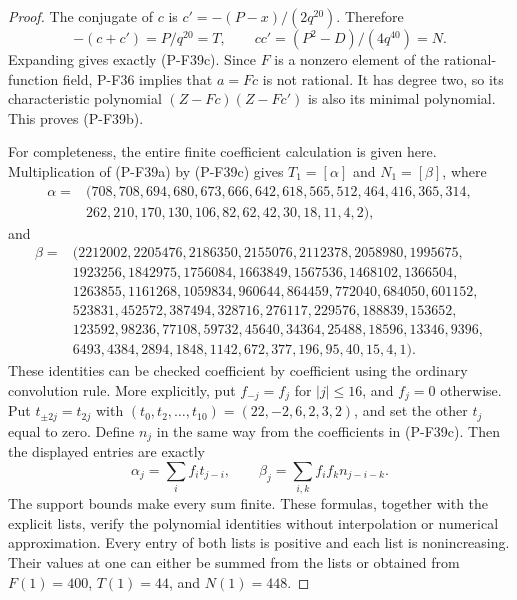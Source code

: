 \begin{proof}
The conjugate of $c$ is $c'=-(P-x)/(2q^{20})$. Therefore
\[
       -(c+c')=P/q^{20}=T,
 \qquad cc'=(P^2-D)/(4q^{40})=N.
 \tag{P-F39d}
\]
Expanding gives exactly (P-F39c). Since $F$ is a nonzero element
of the rational-function field, P-F36 implies that $a=Fc$ is
not rational. It has degree two, so its characteristic polynomial
$(Z-Fc)(Z-Fc')$ is also its minimal polynomial. This proves
(P-F39b).

For completeness, the entire finite coefficient calculation is
given here. Multiplication of (P-F39a) by (P-F39c) gives
$T_1=[\alpha]$ and $N_1=[\beta]$, where
\[
\begin{split}
\alpha={}&(708,708,694,680,673,666,642,618,565,512,464,416,365,314,\\
&262,210,170,130,106,82,62,42,30,18,11,4,2),
\end{split}
 \tag{P-F39e}
\]
and
\[
\begin{split}
\beta={}&(2212002,2205476,2186350,2155076,2112378,2058980,1995675,\\
&1923256,1842975,1756084,1663849,1567536,1468102,1366504,\\
&1263855,1161268,1059834,960644,864459,772040,684050,601152,\\
&523831,452572,387494,328716,276117,229576,188839,153652,\\
&123592,98236,77108,59732,45640,34364,25488,18596,13346,9396,\\
&6493,4384,2894,1848,1142,672,377,196,95,40,15,4,1).
\end{split}
 \tag{P-F39f}
\]
These identities can be checked coefficient by coefficient using
the ordinary convolution rule. More explicitly, put $f_{-j}=f_j$
for $|j|\le16$, and $f_j=0$ otherwise. Put
$t_{\pm 2j}=t_{2j}$ with $(t_0,t_2,\ldots,t_{10})=(22,-2,6,2,3,2)$,
and set the other $t_j$ equal to zero. Define $n_j$ in the same
way from the coefficients in (P-F39c). Then the displayed entries
are exactly
\[
       \alpha_j=\sum_i f_i t_{j-i},\qquad
       \beta_j=\sum_{i,k} f_i f_k n_{j-i-k}.
 \tag{P-F39g}
\]
The support bounds make every sum finite. These formulas,
together with the explicit lists, verify the polynomial identities
without interpolation or numerical approximation. Every entry
of both lists is positive and each list is nonincreasing. Their
values at one can either be summed from the lists or obtained
from $F(1)=400$, $T(1)=44$, and $N(1)=448$.


\end{proof}

